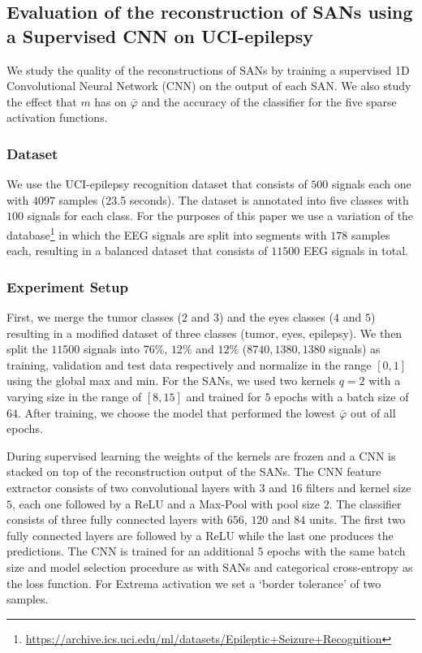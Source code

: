 \documentclass[journal]{IEEEtran}
\begin{document}
\subsection{Evaluation of the reconstruction of SANs using a Supervised CNN on UCI-epilepsy}
We study the quality of the reconstructions of SANs by training a supervised 1D Convolutional Neural Network (CNN) on the output of each SAN.
We also study the effect that $m$ has on $\bar\varphi$ and the accuracy of the classifier for the five sparse activation functions.

\subsubsection{Dataset}
We use the UCI-epilepsy recognition dataset that consists of $500$ signals each one with $4097$ samples (23.5 seconds).
The dataset is annotated into five classes with $100$ signals for each class.
For the purposes of this paper we use a variation of the database\footnote{\url{https://archive.ics.uci.edu/ml/datasets/Epileptic+Seizure+Recognition}} in which the EEG signals are split into segments with $178$ samples each, resulting in a balanced dataset that consists of $11500$ EEG signals in total.

\subsubsection{Experiment Setup}
First, we merge the tumor classes ($2$ and $3$) and the eyes classes ($4$ and $5$) resulting in a modified dataset of three classes (tumor, eyes, epilepsy).
We then split the $11500$ signals into $76\%$, $12\%$ and $12\%$ ($8740,1380,1380$ signals) as training, validation and test data respectively and normalize in the range $[0, 1]$ using the global max and min.
For the SANs, we used two kernels $q=2$ with a varying size in the range of $[8, 15]$ and trained for $5$ epochs with a batch size of $64$.
After training, we choose the model that performed the lowest $\bar\varphi$ out of all epochs.

During supervised learning the weights of the kernels are frozen and a CNN is stacked on top of the reconstruction output of the SANs.
The CNN feature extractor consists of two convolutional layers with $3$ and $16$ filters and kernel size $5$, each one followed by a ReLU and a Max-Pool with pool size $2$.
The classifier consists of three fully connected layers with $656$, $120$ and $84$ units.
The first two fully connected layers are followed by a ReLU while the last one produces the predictions.
The CNN is trained for an additional $5$ epochs with the same batch size and model selection procedure as with SANs and categorical cross-entropy as the loss function.
For Extrema activation we set a `border tolerance' of two samples.
\end{document}
